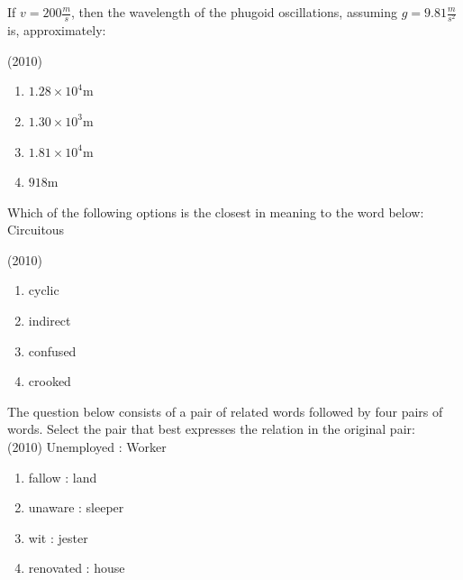     \item If $v=200\frac{m}{s}$, then the wavelength of the phugoid oscillations, assuming $g=9.81\frac{m}{s^2}$ is, approximately:
    
    \hfill{(2010)}

        \begin{multicols}{4}
            \begin{enumerate}
                \item $1.28\times10^4$m
                \item $1.30\times10^3$m
                \item $1.81\times10^4$m
                \item $918$m
            \end{enumerate}
        \end{multicols}


    \item Which of the following options is the closest in meaning to the word below:\\
    Circuitous
    
    \hfill{(2010)}
    
		\begin{multicols}{4}
			\begin{enumerate}
				\item cyclic
				\item indirect
				\item confused
				\item crooked
			\end{enumerate}
		\end{multicols}

    \item The question below consists of a pair of related words followed by four pairs of words. Select the pair that best expresses the relation in the original pair:\\
    
    \hfill{(2010)}
    Unemployed : Worker

    \begin{multicols}{4}
       \begin{enumerate}
            \item fallow : land
            \item unaware : sleeper
            \item wit : jester
            \item renovated : house
        \end{enumerate}
    \end{multicols}
  
